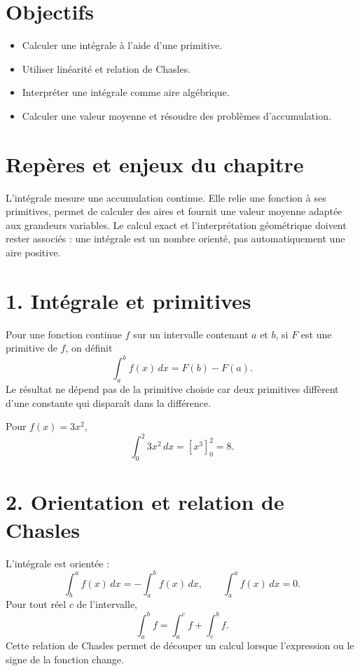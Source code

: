 
\section{Objectifs}
\begin{itemize}
\item Calculer une intégrale à l’aide d’une primitive.
\item Utiliser linéarité et relation de Chasles.
\item Interpréter une intégrale comme aire algébrique.
\item Calculer une valeur moyenne et résoudre des problèmes d’accumulation.
\end{itemize}

\section{Repères et enjeux du chapitre}
L’intégrale mesure une accumulation continue. Elle relie une fonction à ses primitives, permet de calculer des aires et fournit une valeur moyenne adaptée aux grandeurs variables. Le calcul exact et l’interprétation géométrique doivent rester associés : une intégrale est un nombre orienté, pas automatiquement une aire positive.

\section{1. Intégrale et primitives}
Pour une fonction continue $f$ sur un intervalle contenant $a$ et $b$, si $F$ est une primitive de $f$, on définit
\[
\int_a^b f(x)\,dx=F(b)-F(a).
\]
Le résultat ne dépend pas de la primitive choisie car deux primitives diffèrent d’une constante qui disparaît dans la différence.

\begin{exemple}
Pour $f(x)=3x^2$,
\[
\int_0^2 3x^2\,dx=[x^3]_0^2=8.
\]
\end{exemple}

\section{2. Orientation et relation de Chasles}
L’intégrale est orientée :
\[
\int_b^a f(x)\,dx=-\int_a^b f(x)\,dx,\qquad \int_a^a f(x)\,dx=0.
\]
Pour tout réel $c$ de l’intervalle,
\[
\int_a^b f=\int_a^c f+\int_c^b f.
\]
Cette relation de Chasles permet de découper un calcul lorsque l’expression ou le signe de la fonction change.

